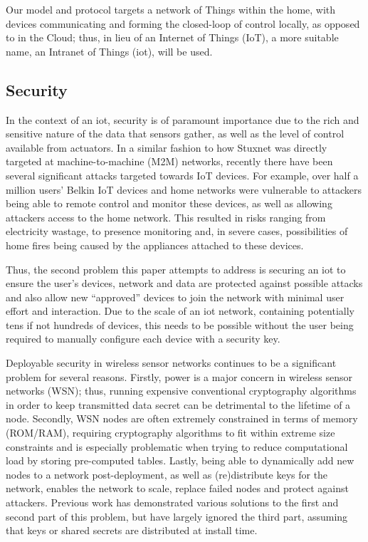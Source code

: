 \documentclass{mpaper}
\begin{document}
Our model and protocol targets a network of Things within the home, with devices communicating and forming the closed-loop of control locally, as opposed to in the Cloud; thus, in lieu of an Internet of Things (IoT), a more suitable name, an Intranet of Things (iot), will be used.

\subsection{Security} %
\label{sub:motivation_security}
In the context of an iot, security is of paramount importance due to the rich and sensitive nature of the data that sensors gather, as well as the level of control available from actuators. In a similar fashion to how Stuxnet was directly targeted at machine-to-machine (M2M) networks\cite{Stuxnet}, recently there have been several significant attacks targeted towards IoT devices\cite{IoTWorm,BelkinWemo}. For example, over half a million users' Belkin IoT devices and home networks were vulnerable to attackers being able to remote control and monitor these devices, as well as allowing attackers access to the home network\cite{BelkinWemo}. This resulted in risks ranging from electricity wastage, to presence monitoring and, in severe cases, possibilities of home fires being caused by the appliances attached to these devices.

Thus, the second problem this paper attempts to address is securing an iot to ensure the user's devices, network and data are protected against possible attacks and also allow new ``approved'' devices to join the network with minimal user effort and interaction. Due to the scale of an iot network, containing potentially tens if not hundreds of devices, this needs to be possible without the user being required to manually configure each device with a security key.

Deployable security in wireless sensor networks continues to be a significant problem for several reasons. Firstly, power is a major concern in wireless sensor networks (WSN); thus, running expensive conventional cryptography algorithms in order to keep transmitted data secret can be detrimental to the lifetime of a node. Secondly, WSN nodes are often extremely constrained in terms of memory (ROM/RAM), requiring cryptography algorithms to fit within extreme size constraints and is especially problematic when trying to reduce computational load by storing pre-computed tables. Lastly, being able to dynamically add new nodes to a network post-deployment, as well as (re)distribute keys for the network, enables the network to scale, replace failed nodes and protect against attackers. Previous work has demonstrated various solutions to the first and second part of this problem\cite{TinySec,MiniSec,TinyECC}, but have largely ignored the third part, assuming that keys or shared secrets are distributed at install time.
\end{document}

